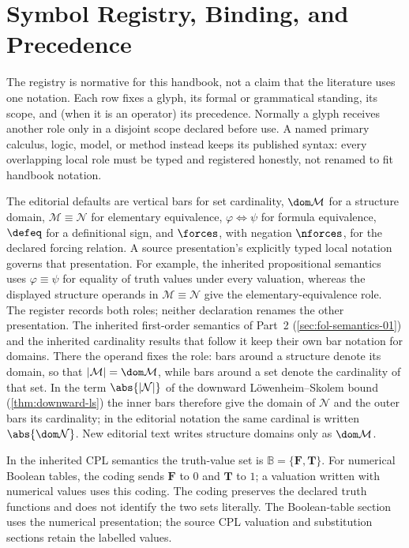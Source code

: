 \chapter{Symbol Registry, Binding, and Precedence}
\label{sec:p01-symbol-registry}

The registry is normative for this handbook, not a claim that the literature
uses one notation.  Each row fixes a glyph, its formal or grammatical
standing, its scope, and (when it is an operator) its precedence.  Normally a
glyph receives another role only in a disjoint scope declared before use.  A
named primary calculus, logic, model, or method instead keeps its published
syntax: every overlapping local role must be typed and registered honestly,
not renamed to fit handbook notation.

The editorial defaults are vertical bars for set cardinality,
\(\dom\mathcal M\) for a structure domain,
\(\mathcal M\equiv\mathcal N\) for elementary equivalence,
\(\varphi\Leftrightarrow\psi\) for formula equivalence,
\(\defeq\) for a definitional sign, and \(\forces\), with negation
\(\nforces\), for the declared forcing relation.  A source presentation's
explicitly typed local notation governs that presentation.  For example,
the inherited propositional semantics uses \(\varphi\equiv\psi\) for
equality of truth values under every valuation, whereas the displayed
structure operands in \(\mathcal M\equiv\mathcal N\) give the
elementary-equivalence role.  The register records both roles; neither
declaration renames the other presentation.
The inherited first-order semantics of Part~2 (\cref{sec:fol-semantics-01})
and the inherited cardinality results that follow it keep their own bar
notation for domains.  There the operand fixes the role: bars around a
structure denote its domain, so that \(\lvert\mathcal M\rvert=\dom\mathcal M\),
while bars around a set denote the cardinality of that set.  In the
term \(\abs{\lvert\mathcal N\rvert}\) of the downward L\"owenheim--Skolem bound
(\cref{thm:downward-ls}) the inner bars therefore give the domain of
\(\mathcal N\) and the outer bars its cardinality; in the editorial
notation the same cardinal is written \(\abs{\dom\mathcal N}\).  New
editorial text writes structure domains only as \(\dom\mathcal M\).

In the inherited CPL semantics the truth-value set is
\(\mathbb B=\{\mathbf F,\mathbf T\}\).
For numerical Boolean tables, the coding sends \(\mathbf F\) to \(0\)
and \(\mathbf T\) to \(1\); a valuation written with numerical values
uses this coding.  The coding preserves the declared truth functions and
does not identify the two sets literally.  The Boolean-table section uses
the numerical presentation; the source CPL valuation and substitution
sections retain the labelled values.

